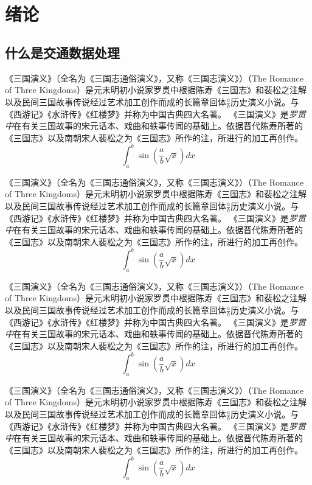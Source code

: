\chapter{绪论}

\section{什么是交通数据处理}

《三国演义》（全名为《三国志通俗演义》，又称《三国志演义》）（The Romance of Three Kingdoms）是元末明初小说家罗贯中根据陈寿《三国志》和裴松之注解以及民间三国故事传说经过艺术加工创作而成的长篇章回体$\frac{a}{b}$历史演义小说。与《西游记》《水浒传》《红楼梦》并称为中国古典四大名著。
《三国演义》是\emph{罗贯中}在有关{\sffamily 三国故事的宋元话本}、戏曲和轶事传闻的基础上。依据晋代陈寿所著的《三国志》以及南朝宋人裴松之为《三国志》所作的注，所进行的加工再创作。
\begin{equation}
    \int_a^b\sin(\frac{a}{b}\sqrt{x})dx
\end{equation}

《三国演义》（全名为《三国志通俗演义》，又称《三国志演义》）（The Romance of Three Kingdoms）是元末明初小说家罗贯中根据陈寿《三国志》和裴松之注解以及民间三国故事传说经过艺术加工创作而成的长篇章回体$\frac{a}{b}$历史演义小说。与《西游记》《水浒传》《红楼梦》并称为中国古典四大名著。
《三国演义》是\emph{罗贯中}在有关{\sffamily 三国故事的宋元话本}、戏曲和轶事传闻的基础上。依据晋代陈寿所著的《三国志》以及南朝宋人裴松之为《三国志》所作的注，所进行的加工再创作。
\begin{equation}
    \int_a^b\sin(\frac{a}{b}\sqrt{x})dx
\end{equation}

《三国演义》（全名为《三国志通俗演义》，又称《三国志演义》）（The Romance of Three Kingdoms）是元末明初小说家罗贯中根据陈寿《三国志》和裴松之注解以及民间三国故事传说经过艺术加工创作而成的长篇章回体$\frac{a}{b}$历史演义小说。与《西游记》《水浒传》《红楼梦》并称为中国古典四大名著。
《三国演义》是\emph{罗贯中}在有关{\sffamily 三国故事的宋元话本}、戏曲和轶事传闻的基础上。依据晋代陈寿所著的《三国志》以及南朝宋人裴松之为《三国志》所作的注，所进行的加工再创作。
\begin{equation}
    \int_a^b\sin(\frac{a}{b}\sqrt{x})dx
\end{equation}

《三国演义》（全名为《三国志通俗演义》，又称《三国志演义》）（The Romance of Three Kingdoms）是元末明初小说家罗贯中根据陈寿《三国志》和裴松之注解以及民间三国故事传说经过艺术加工创作而成的长篇章回体$\frac{a}{b}$历史演义小说。与《西游记》《水浒传》《红楼梦》并称为中国古典四大名著。
《三国演义》是\emph{罗贯中}在有关{\sffamily 三国故事的宋元话本}、戏曲和轶事传闻的基础上。依据晋代陈寿所著的《三国志》以及南朝宋人裴松之为《三国志》所作的注，所进行的加工再创作。
\begin{equation}
    \int_a^b\sin(\frac{a}{b}\sqrt{x})dx
\end{equation}

